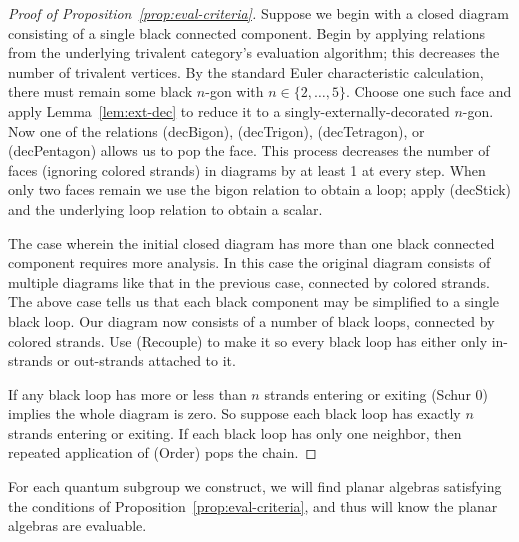 \begin{proof}[Proof of Proposition~\ref{prop:eval-criteria}]
    Suppose we begin with a closed diagram consisting of a single black connected component.
    Begin by applying relations from the underlying trivalent category's evaluation algorithm; this decreases the number of trivalent vertices.
    By the standard Euler characteristic calculation, there must remain some black $n$-gon with $n\in\{ 2,\dots,5 \}$.
    Choose one such face and apply Lemma~\ref{lem:ext-dec} to reduce it to a singly-externally-decorated $n$-gon.
    Now one of the relations (decBigon), (decTrigon), (decTetragon), or (decPentagon) allows us to pop the face.
    This process decreases the number of faces (ignoring colored strands) in diagrams by at least 1 at every step.
    When only two faces remain we use the bigon relation to obtain a loop; apply (decStick) and the underlying loop relation to obtain a scalar.
    
    The case wherein the initial closed diagram has more than one black connected component requires more analysis.
    In this case the original diagram consists of multiple diagrams like that in the previous case, connected by colored strands.
    The above case tells us that each black component may be simplified to a single black loop.
    Our diagram now consists of a number of black loops, connected by colored strands.
    Use (Recouple) to make it so every black loop has either only in-strands or out-strands attached to it.
    
    If any black loop has more or less than $n$ strands entering or exiting (Schur 0) implies the whole diagram is zero.
    So suppose each black loop has exactly $n$ strands entering or exiting.
    If each black loop has only one neighbor, then repeated application of (Order) pops the chain.
\end{proof}

For each quantum subgroup we construct, we will find planar algebras satisfying the conditions of Proposition~\ref{prop:eval-criteria}, and thus will know the planar algebras are evaluable. 



